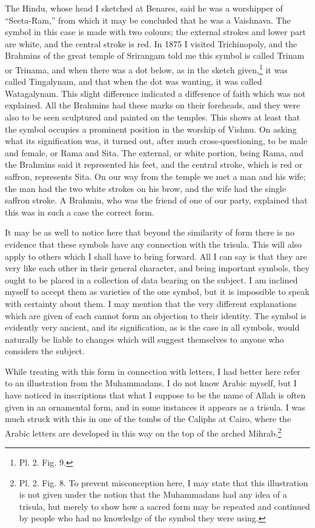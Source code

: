 \documentclass[a4paper, 11pt, oneside, english]{article}
\begin{document}
The Hindu, whose head I sketched at Benares, said he was a worshipper of ``Seeta-Ram,'' from which it may be concluded that he was a Vaishnava. The symbol in this case is made with two colours; the external strokes and lower part are white, and the central stroke is red. In 1875 I visited Trichinopoly, and the Brahmins of the great temple of Srirangam told me this symbol is called Trinam or Trinama, and when there was a dot below, as in the sketch given,\footnote{Pl. 2. Fig. 9.} it was called Tingalynam, and that when the dot was wanting, it was called Watagalynam. This slight difference indicated a difference of faith which was not explained. All the Brahmins had these marks on their foreheads, and they were also to be seen sculptured and painted on the temples. This shows at least that the symbol occupies a prominent position in the worship of Vishnu. On asking what its signification was, it turned out, after much cross-questioning, to be male and female, or Rama and Sita. The external, or white portion, being Rama, and the Brahmins said it represented his feet, and the central stroke, which is red or saffron, represents Sita. On our way from the temple we met a man and his wife; the man had the two white strokes on his brow, and the wife had the single saffron stroke. A Brahmin, who was the friend of one of our party, explained that this was in such a case the correct form.

It may be as well to notice here that beyond the similarity of form there is no evidence that these symbols have any connection with the trisula. This will also apply to others which I shall have to bring forward. All I can say is that they are very like each other in their general character, and being important symbols, they ought to be placed in a collection of data bearing on the subject. I am inclined myself to accept them as varieties of the one symbol, but it is impossible to speak with certainty about them. I may mention that the very different explanations which are given of each cannot form an objection to their identity. The symbol is evidently very ancient, and its signification, as is the case in all symbols, would naturally be liable to changes which will suggest themselves to anyone who considers the subject.

While treating with this form in connection with letters, I had better here refer to an illustration from the Muhammadans. I do not know Arabic myself, but I have noticed in inscriptions that what I suppose to be the name of Allah is often given in an ornamental form, and in some instances it appears as a trisula. I was much struck with this in one of the tombs of the Caliphs at Cairo, where the Arabic letters are developed in this way on the top of the arched Mihrab.\footnote{Pl. 2. Fig. 8. To prevent misconception here, I may state that this illustration is not given under the notion that the Muhammadans had any idea of a trisula, hut merely to show how a sacred form may be repeated and continued by people who had no knowledge of the symbol they were using.}
\end{document}
